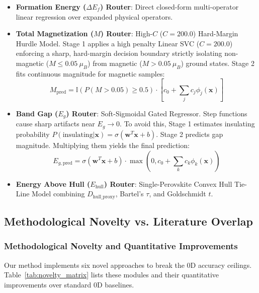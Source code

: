 \documentclass[12pt,onecolumn]{elsarticle}
\begin{document}
\begin{itemize}
\item \textbf{Formation Energy ($\Delta E_f$) Router}: Direct closed-form multi-operator linear regression over expanded physical operators.
\item \textbf{Total Magnetization ($M$) Router}: High-$C$ ($C=200.0$) Hard-Margin Hurdle Model. Stage 1 applies a high penalty Linear SVC ($C=200.0$) enforcing a sharp, hard-margin decision boundary strictly isolating non-magnetic ($M \le 0.05\ \mu_B$) from magnetic ($M > 0.05\ \mu_B$) ground states. Stage 2 fits continuous magnitude for magnetic samples:
  \begin{equation}
  M_{\text{pred}} = \mathbb{I}\left(P(M > 0.05) \ge 0.5\right) \cdot \left[ c_0 + \sum_j c_j \phi_j(\mathbf{x}) \right]
  \end{equation}
\item \textbf{Band Gap ($E_g$) Router}: Soft-Sigmoidal Gated Regressor. Step functions cause sharp artifacts near $E_g \to 0$. To avoid this, Stage 1 estimates insulating probability $P(\text{insulating}|\mathbf{x}) = \sigma(\mathbf{w}^T \mathbf{x} + b)$. Stage 2 predicts gap magnitude. Multiplying them yields the final prediction:
  \begin{equation}
  E_{g, \text{pred}} = \sigma(\mathbf{w}^T \mathbf{x} + b) \cdot \max\left(0, c_0 + \sum_k c_k \phi_k(\mathbf{x})\right)
  \end{equation}
\item \textbf{Energy Above Hull ($E_{\text{hull}}$) Router}: Single-Perovskite Convex Hull Tie-Line Model combining $D_{\text{hull\_proxy}}$, Bartel's $\tau$, and Goldschmidt $t$.
\end{itemize}

\subsection{Methodological Novelty vs. Literature Overlap}

\subsubsection{Methodological Novelty and Quantitative Improvements}
Our method implements six novel approaches to break the 0D accuracy ceilings. Table~\ref{tab:novelty_matrix} lists these modules and their quantitative improvements over standard 0D baselines.
\end{document}

